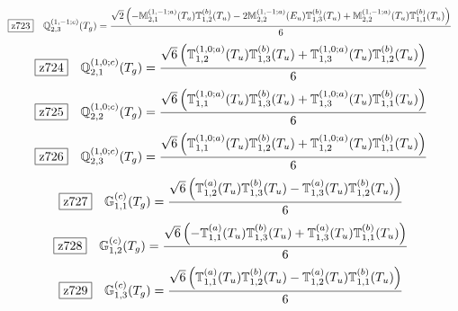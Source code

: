 \documentclass[fleqn,10pt,landscape]{jsarticle}
\begin{document}
\begin{dmath*}
\hspace*{3mm}\fbox{z723}\quad \mathbb{Q}_{2,3}^{(1,-1;c)}(T_{g})=\frac{\sqrt{2} \left(- \mathbb{M}_{2,1}^{(1,-1;a)}(T_{u}) \mathbb{T}_{1,2}^{(b)}(T_{u}) - 2 \mathbb{M}_{2,2}^{(1,-1;a)}(E_{u}) \mathbb{T}_{1,3}^{(b)}(T_{u}) + \mathbb{M}_{2,2}^{(1,-1;a)}(T_{u}) \mathbb{T}_{1,1}^{(b)}(T_{u})\right)}{6}
\end{dmath*}
\begin{dmath*}
\hspace*{3mm}\fbox{z724}\quad \mathbb{Q}_{2,1}^{(1,0;c)}(T_{g})=\frac{\sqrt{6} \left(\mathbb{T}_{1,2}^{(1,0;a)}(T_{u}) \mathbb{T}_{1,3}^{(b)}(T_{u}) + \mathbb{T}_{1,3}^{(1,0;a)}(T_{u}) \mathbb{T}_{1,2}^{(b)}(T_{u})\right)}{6}
\end{dmath*}
\begin{dmath*}
\hspace*{3mm}\fbox{z725}\quad \mathbb{Q}_{2,2}^{(1,0;c)}(T_{g})=\frac{\sqrt{6} \left(\mathbb{T}_{1,1}^{(1,0;a)}(T_{u}) \mathbb{T}_{1,3}^{(b)}(T_{u}) + \mathbb{T}_{1,3}^{(1,0;a)}(T_{u}) \mathbb{T}_{1,1}^{(b)}(T_{u})\right)}{6}
\end{dmath*}
\begin{dmath*}
\hspace*{3mm}\fbox{z726}\quad \mathbb{Q}_{2,3}^{(1,0;c)}(T_{g})=\frac{\sqrt{6} \left(\mathbb{T}_{1,1}^{(1,0;a)}(T_{u}) \mathbb{T}_{1,2}^{(b)}(T_{u}) + \mathbb{T}_{1,2}^{(1,0;a)}(T_{u}) \mathbb{T}_{1,1}^{(b)}(T_{u})\right)}{6}
\end{dmath*}
\begin{dmath*}
\hspace*{3mm}\fbox{z727}\quad \mathbb{G}_{1,1}^{(c)}(T_{g})=\frac{\sqrt{6} \left(\mathbb{T}_{1,2}^{(a)}(T_{u}) \mathbb{T}_{1,3}^{(b)}(T_{u}) - \mathbb{T}_{1,3}^{(a)}(T_{u}) \mathbb{T}_{1,2}^{(b)}(T_{u})\right)}{6}
\end{dmath*}
\begin{dmath*}
\hspace*{3mm}\fbox{z728}\quad \mathbb{G}_{1,2}^{(c)}(T_{g})=\frac{\sqrt{6} \left(- \mathbb{T}_{1,1}^{(a)}(T_{u}) \mathbb{T}_{1,3}^{(b)}(T_{u}) + \mathbb{T}_{1,3}^{(a)}(T_{u}) \mathbb{T}_{1,1}^{(b)}(T_{u})\right)}{6}
\end{dmath*}
\begin{dmath*}
\hspace*{3mm}\fbox{z729}\quad \mathbb{G}_{1,3}^{(c)}(T_{g})=\frac{\sqrt{6} \left(\mathbb{T}_{1,1}^{(a)}(T_{u}) \mathbb{T}_{1,2}^{(b)}(T_{u}) - \mathbb{T}_{1,2}^{(a)}(T_{u}) \mathbb{T}_{1,1}^{(b)}(T_{u})\right)}{6}
\end{dmath*}
\end{document}
